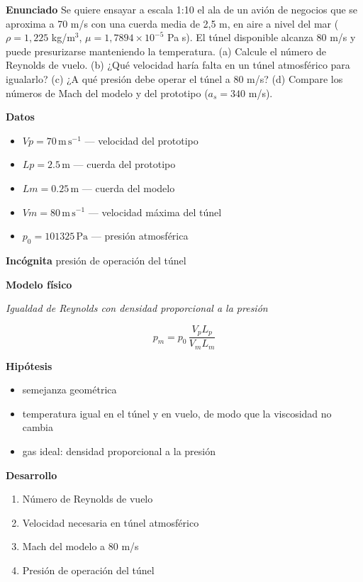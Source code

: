 \documentclass[10pt,openany]{book}
\begin{document}
\begin{tcolorbox}[title={Problema resuelto}, studiumworked, breakable]

\noindent\textbf{Enunciado}
Se quiere ensayar a escala 1:10 el ala de un avión de negocios que se aproxima a 70 m/s con una cuerda media de 2,5 m, en aire a nivel del mar (\(\rho = 1{,}225\) kg/m\(^3\), \(\mu = 1{,}7894\times 10^{-5}\) Pa s). El túnel disponible alcanza 80 m/s y puede presurizarse manteniendo la temperatura. (a) Calcule el número de Reynolds de vuelo. (b) ¿Qué velocidad haría falta en un túnel atmosférico para igualarlo? (c) ¿A qué presión debe operar el túnel a 80 m/s? (d) Compare los números de Mach del modelo y del prototipo (\(a_s = 340\) m/s).

\noindent\textbf{Datos}
\begin{itemize}
\item $Vp = 70\,\mathrm{m}\,\mathrm{s}^{-1}$ — velocidad del prototipo
\item $Lp = 2.5\,\mathrm{m}$ — cuerda del prototipo
\item $Lm = 0.25\,\mathrm{m}$ — cuerda del modelo
\item $Vm = 80\,\mathrm{m}\,\mathrm{s}^{-1}$ — velocidad máxima del túnel
\item $p_{0} = 101325\,\mathrm{Pa}$ — presión atmosférica
\end{itemize}

\noindent\textbf{Incógnita}
presión de operación del túnel

\noindent\textbf{Modelo físico}

\noindent\textit{Igualdad de Reynolds con densidad proporcional a la presión}

\[
p_m = p_0\,\frac{V_p L_p}{V_m L_m}
\]

\noindent\textbf{Hipótesis}
\begin{itemize}
\item semejanza geométrica
\item temperatura igual en el túnel y en vuelo, de modo que la viscosidad no cambia
\item gas ideal: densidad proporcional a la presión
\end{itemize}

\noindent\textbf{Desarrollo}
\begin{enumerate}
\item
Número de Reynolds de vuelo
\item
Velocidad necesaria en túnel atmosférico
\item
Mach del modelo a 80 m/s
\item
Presión de operación del túnel
\end{enumerate}


\end{tcolorbox}
\end{document}
